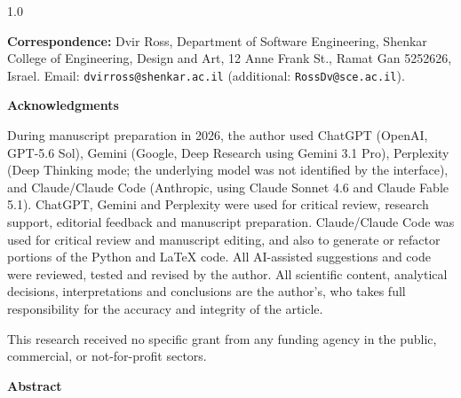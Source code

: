 \documentclass[12pt]{article}
\begin{document}
\begin{titlepage}
\begin{spacing}{1.0}
\begin{flushleft}
  \medskip
  \textbf{Correspondence:} Dvir Ross, Department of Software Engineering, Shenkar
  College of Engineering, Design and Art, 12 Anne Frank St., Ramat Gan 5252626, Israel.
  Email: \texttt{dvirross@shenkar.ac.il} (additional: \texttt{RossDv@sce.ac.il}).
  \end{flushleft}
  \vspace{0.4cm}
  {\normalsize\bfseries Acknowledgments\par}
  \vspace{0.2cm}
  \begin{flushleft}\small
During manuscript preparation in 2026, the author used ChatGPT (OpenAI, GPT-5.6 Sol),
  Gemini (Google, Deep Research using Gemini 3.1 Pro), Perplexity (Deep Thinking mode; the
  underlying model was not identified by the interface), and Claude/Claude Code (Anthropic,
  using Claude Sonnet 4.6 and Claude Fable 5.1). ChatGPT, Gemini and Perplexity were used
  for critical review, research support, editorial feedback and manuscript preparation.
  Claude/Claude Code was used for critical review and manuscript editing, and also to
  generate or refactor portions of the Python and \LaTeX{} code. All AI-assisted
  suggestions and code were reviewed, tested and revised by the author. All scientific
  content, analytical decisions, interpretations and conclusions are the author's, who
  takes full responsibility for the accuracy and integrity of the article.
  
    This research received no specific grant from any funding agency in the public,
  commercial, or not-for-profit sectors.
  \end{flushleft}
  \end{spacing}
\end{titlepage}

\newpage
\begin{center}{\bfseries Abstract}\end{center}
\end{document}
